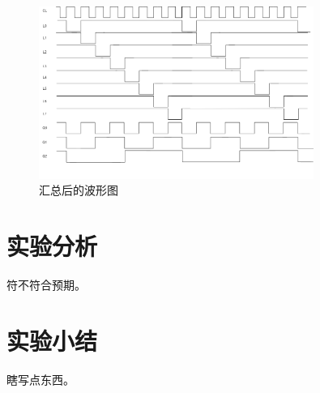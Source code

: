 \documentclass[zihao=-4]{ctexart} %
\begin{document}
\begin{figure}[htbp]
    \centering
    \includegraphics[width=0.8\textwidth]{../Ex1/img/boxi.png}
    \caption{汇总后的波形图}
    \label{fig:wavesummary}
\end{figure}
\section{实验分析}
符不符合预期。

\section{实验小结}
瞎写点东西。
\end{document}
